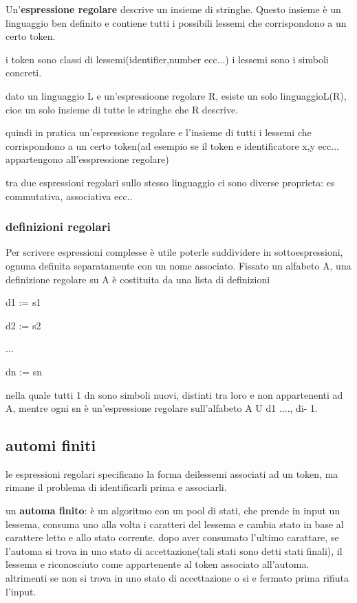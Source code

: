 \documentclass[12pt]{article}
\begin{document}
Un’\textbf{espressione regolare} descrive un insieme di stringhe.
Questo insieme è un linguaggio ben definito e contiene tutti i possibili lessemi
che corrispondono a un certo token.

i token sono classi di lessemi(identifier,number ecc...) i lessemi sono i simboli concreti.

dato un linguaggio L e un'espressioone regolare R, esiste un solo linguaggioL(R), cioe un solo insieme di tutte le stringhe che R descrive.

quindi in pratica un'espressione regolare e l'insieme di tutti i lessemi che corrispondono a un certo token(ad esempio se il token e identificatore x,y ecc... appartengono all'esspressione regolare)

tra due espressioni regolari sullo stesso linguaggio ci sono diverse proprieta: es commutativa, associativa ecc..

\subsubsection{definizioni regolari}
Per scrivere espressioni complesse è utile poterle suddividere in sottoespressioni, ognuna definita separatamente con un nome associato.
Fissato un alfabeto A, una definizione regolare su A è costituita da una lista di
definizioni

d1 := s1

d2 := s2

...

dn := sn

nella quale tutti 1 dn sono simboli nuovi, distinti tra loro e non appartenenti ad A,
mentre ogni sn è un'espressione regolare sull'alfabeto A U { d1  ...., di- 1}.

\subsection{automi finiti}

le espressioni regolari specificano la forma deilessemi associati ad un token, ma rimane il problema di identificarli prima e associarli.

un \textbf{automa finito}: è un algoritmo con un pool di stati, che prende in input un lessema, consuma uno alla volta i caratteri del lessema e cambia stato in base al carattere letto e allo stato corrente.
dopo aver consumato l'ultimo carattare, se l'automa si trova in uno stato di accettazione(tali stati sono detti stati finali), il lessema e riconosciuto come appartenente al token associato all'automa. altrimenti se non si trova in uno stato di accettazione o si e fermato prima rifiuta l'input.
\end{document}
